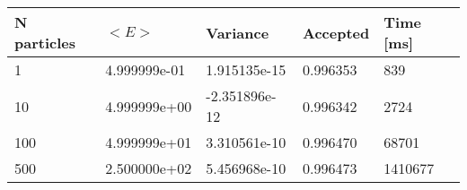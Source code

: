 \begin{table}[h!]
\begin{tabular}{|l|l|l|l|l|}
\hline 
N particles & $<E>$ & Variance & Accepted & Time [ms]\\ 
 \hline 
1 & 4.999999e-01 & 1.915135e-15 & 0.996353 & 839 \\ \hline 
10 & 4.999999e+00 & -2.351896e-12 & 0.996342 & 2724 \\ \hline 
100 & 4.999999e+01 & 3.310561e-10 & 0.996470 & 68701 \\ \hline 
500 & 2.500000e+02 & 5.456968e-10 & 0.996473 & 1410677 \\ \hline 
\end{tabular}
\label{i:n1} 
\end{table}
